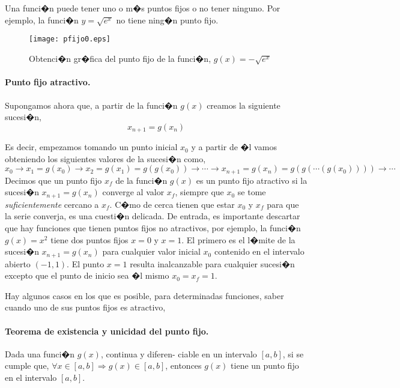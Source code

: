 Una funci�n puede tener uno o m�s puntos fijos o no tener ninguno. Por ejemplo, la funci�n $y=\sqrt{e^x}$ no tiene ning�n punto fijo.


\begin{figure}[h]
\texttt{[image: pfijo0.eps]}
\caption{Obtenci�n gr�fica del punto fijo de la funci�n, $g(x)=-\sqrt{e^x}$}
\label{fig:pfijo0}
\end{figure}

\paragraph{Punto fijo atractivo.} Supongamos ahora que, a partir de la funci�n $g(x)$ creamos la siguiente sucesi�n,
\begin{equation*}
x_{n+1}=g(x_n)
\end{equation*}

Es decir, empezamos tomando un punto inicial $x_0$ y a partir de �l vamos obteniendo los siguientes valores de la sucesi�n como,
\begin{equation*}
x_0\rightarrow x_1=g(x_0)\rightarrow x_2=g(x_1)=g\left(g(x_0)\right) \rightarrow \cdots \rightarrow x_{n+1}=g(x_{n})=g\left( g\left( \cdots\left( g(x_0)\right)\right)\right) \rightarrow \cdots
\end{equation*}
Decimos que un punto fijo $x_f$ de la funci�n $g(x)$ es un punto fijo atractivo si la sucesi�n $x_{n+1}=g(x_n)$ converge al valor $x_f$, siempre que $x_0$ se tome \emph{suficientemente} cercano a $x_f$. C�mo de cerca tienen que estar $x_0$ y $x_f$ para que la serie converja, es una cuesti�n delicada. De entrada, es importante descartar que hay funciones que tienen puntos fijos no atractivos, por ejemplo, la funci�n $g(x)=x^2$ tiene dos puntos fijos $x=0$ y $x=1$. El primero es el l�mite de la sucesi�n $x_{n+1}=g(x_n)$ para cualquier valor inicial $x_0$ contenido en el intervalo abierto $(-1,  1)$. El punto $x=1$ resulta inalcanzable para cualquier sucesi�n excepto que el punto de inicio sea �l mismo $x_0=x_f=1$.

Hay algunos casos en los que  es posible, para determinadas funciones, saber cuando uno de sus puntos fijos es atractivo,

\paragraph{Teorema de existencia y unicidad del punto fijo.} Dada una funci�n $g(x)$,  continua y diferen-\- ciable en un intervalo $[a, b]$, si se cumple que, $\forall x \in [a, b] \Rightarrow g(x)\in [a,b]$,  entonces $g(x)$ tiene un punto fijo en el intervalo $[a, b]$. 


